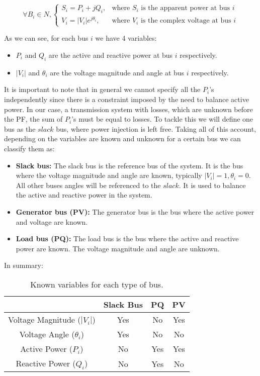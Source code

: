 \documentclass[a4paper,11pt, titlepage, twoside]{article}
\begin{document}
\begin{equation}
    \forall B_i \in N,
    \begin{cases}
        S_i = P_i + jQ_i, & \text{where } S_i \text{ is the apparent power at bus } i \\
        V_i = |V_i|e^{j\theta_i}, & \text{where } V_i \text{ is the complex voltage at bus } i
    \end{cases}
\end{equation}

As we can see, for each bus $i$ we have 4 variables:

\begin{itemize}
    \item $P_i$ and $Q_i$ are the active and reactive power at bus $i$ respectively.
    \item $|V_i|$ and $\theta_i$ are the voltage magnitude and angle at bus $i$ respectively.
\end{itemize}

It is important to note that in general we cannot specify all the $P_i$'s independently since there is a constraint imposed by the need to balance active power. In our case, a transmission system with losses, which are unknown before the PF,
the sum of $P_i$'s must be equal to losses. To tackle this we will define one bus as the $slack$ bus, where power injection is left free. Taking all of this account, depending on the variables are known and unknown for a certain bus we can classify them as:
\begin{itemize}
    \item \textbf{Slack bus:} The slack bus is the reference bus of the system. It is the bus where the voltage magnitude and angle are known, typically $|V_i|= 1, \theta_i= 0 $.
    All other buses angles will be referenced to the $slack$. It is used to balance the active and reactive power in the system.
    \item \textbf{Generator bus (PV):} The generator bus is the bus where the active power and voltage are known.
    \item \textbf{Load bus (PQ):} The load bus is the bus where the active and reactive power are known. The voltage magnitude and angle are unknown.
\end{itemize}
In summary:
\begin{table}[h]
    \centering
    \begin{tabular}{|c|c|c|c|}
        \hline
        & Slack Bus & PQ & PV \\
        \hline
        Voltage Magnitude ($|V_i|$) & Yes & No & Yes \\
        \hline
        Voltage Angle ($\theta_i$) & Yes & No & No \\
        \hline
        Active Power ($P_i$) & No & Yes & Yes \\
        \hline
        Reactive Power ($Q_i$) & No & Yes & No \\
        \hline
    \end{tabular}
    \caption{Known variables for each type of bus.}
    \label{tab:bus_variables}
\end{table}
\end{document}
